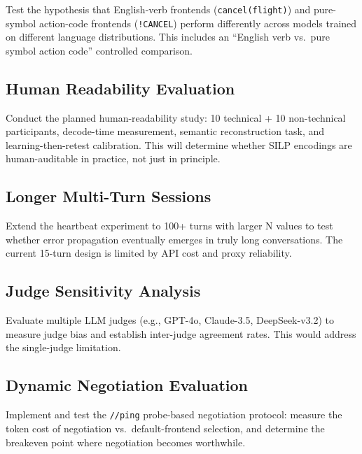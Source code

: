 \documentclass{article}
\begin{document}
Test the hypothesis that English-verb frontends (\texttt{cancel(flight)}) and pure-symbol action-code frontends (\texttt{!CANCEL}) perform differently across models trained on different language distributions. This includes an ``English verb vs.~pure symbol action code'' controlled comparison.



\subsection{Human Readability Evaluation}\label{human-readability-evaluation}



Conduct the planned human-readability study: 10 technical + 10 non-technical participants, decode-time measurement, semantic reconstruction task, and learning-then-retest calibration. This will determine whether SILP encodings are human-auditable in practice, not just in principle.



\subsection{Longer Multi-Turn Sessions}\label{longer-multi-turn-sessions}



Extend the heartbeat experiment to 100+ turns with larger N values to test whether error propagation eventually emerges in truly long conversations. The current 15-turn design is limited by API cost and proxy reliability.



\subsection{Judge Sensitivity Analysis}\label{judge-sensitivity-analysis}



Evaluate multiple LLM judges (e.g., GPT-4o, Claude-3.5, DeepSeek-v3.2) to measure judge bias and establish inter-judge agreement rates. This would address the single-judge limitation.



\subsection{Dynamic Negotiation Evaluation}\label{dynamic-negotiation-evaluation}



Implement and test the \texttt{//ping} probe-based negotiation protocol: measure the token cost of negotiation vs.~default-frontend selection, and determine the breakeven point where negotiation becomes worthwhile.
\end{document}
